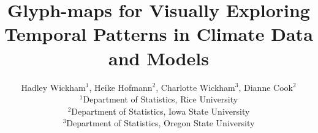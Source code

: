 \documentclass[oneside]{article}
\begin{document}
\doublespacing
\title{Glyph-maps for Visually Exploring Temporal Patterns in Climate Data and Models}
\author{Hadley Wickham$^1$, Heike Hofmann$^2$, Charlotte Wickham$^3$, Dianne Cook$^2$\\
$^1$Department of Statistics, Rice University\\
$^2$Department of Statistics, Iowa State University\\
$^3$Department of Statistics, Oregon State University}
\date{}




%
%
\maketitle


\end{document}
